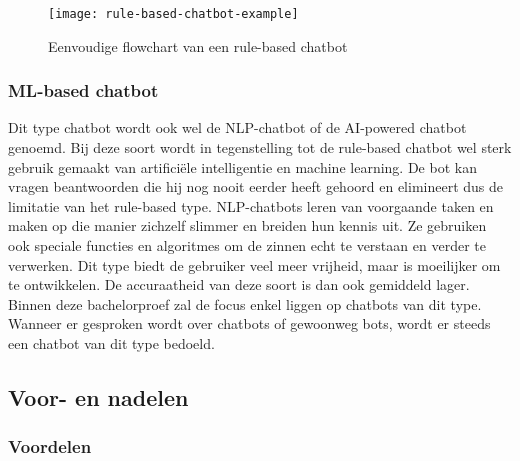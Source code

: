 \begin{figure}[!htbp]
    \label{fig:rule-based-chatbot-example}
    \centering
    \texttt{[image: rule-based-chatbot-example]}
    \caption{Eenvoudige flowchart van een rule-based chatbot \autocite{Shridhar2017}}
\end{figure}

\subsubsection{ML-based chatbot}
\label{subsubsec:chatbots-soorten-ml-based-chatbot}


Dit type chatbot wordt ook wel de NLP-chatbot of de AI-powered chatbot genoemd. Bij deze soort wordt in tegenstelling tot de rule-based chatbot wel sterk gebruik gemaakt van artificiële intelligentie en machine learning. De bot kan vragen beantwoorden die hij nog nooit eerder heeft gehoord en elimineert dus de limitatie van het rule-based type. NLP-chatbots leren van voorgaande taken en maken op die manier zichzelf slimmer en breiden hun kennis uit. Ze gebruiken ook speciale functies en algoritmes om de zinnen echt te verstaan en verder te verwerken. Dit type biedt de gebruiker veel meer vrijheid, maar is moeilijker om te ontwikkelen. De accuraatheid van deze soort is dan ook gemiddeld lager. Binnen deze bachelorproef zal de focus enkel liggen op chatbots van dit type. Wanneer er gesproken wordt over chatbots of gewoonweg bots, wordt er steeds een chatbot van dit type bedoeld.

\subsection{Voor- en nadelen}
\label{subsec:chatbots-voor-en-nadelen}

\subsubsection{Voordelen}
\label{subsubsec:chatbots-voor-en-nadelen-voordelen}

